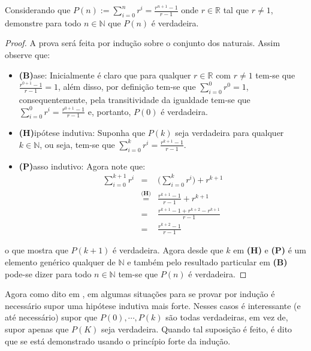 \begin{exemplo}\label{exe:InducaoFraca4}
	Considerando que $\displaystyle P(n) := \sum_{i = 0}^{n} r^i = \frac{r^{n+1} - 1}{r - 1}$ onde $r \in \mathbb{R}$ tal que $r \neq 1$, demonstre para todo $n \in \mathbb{N}$ que $P(n)$ é verdadeira.
	
	\begin{proof}
		A prova será feita por indução sobre o conjunto dos naturais. Assim observe que:
		\begin{itemize}
			\item[ ] \textbf{(B)}ase: Inicialmente é claro que para qualquer $r \in \mathbb{R}$ com $r \neq 1$ tem-se que $\frac{r^{0+1} - 1}{r - 1} = 1$, além disso, por definição tem-se que $\displaystyle \sum_{i=0}^{0} r^0 = 1$, consequentemente, pela transitividade da igualdade tem-se que  $\displaystyle\sum_{i = 0}^{0} r^i =\frac{r^{0+1} - 1}{r - 1} $ e, portanto, $P(0)$ é verdadeira.
			\item[ ] \textbf{(H)}ipótese indutiva: Suponha que $P(k)$ seja verdadeira para qualquer $k \in \mathbb{N}$, ou seja, tem-se que $\displaystyle\sum_{i = 0}^{k} r^i = \frac{r^{k+1} - 1}{r - 1}$.
			\item[ ] \textbf{(P)}asso indutivo:  Agora note que:
			\begin{eqnarray*}
				\sum_{i = 0}^{k+1} r^i & = & \Big(\sum_{i = 0}^{k} r^i\Big) + r^{k+1}\\
				& \stackrel{\textbf{(H)}}{=} & \frac{r^{k+1} - 1}{r - 1} + r^{k+1}\\
				& = & \frac{r^{k+1}-1 + r^{k+2} - r^{k+ 1}}{r-1}\\
				& = & \frac{r^{k+2}-1}{r-1}
			\end{eqnarray*}
		\end{itemize}
		o que mostra que $P(k + 1)$ é verdadeira. Agora desde que $k$ em \textbf{(H)} e \textbf{(P)} é um elemento genérico qualquer de $\mathbb{N}$ e também pelo resultado particular em  \textbf{(B)} pode-se dizer para todo $n \in \mathbb{N}$ tem-se que $P(n)$ é verdadeira.
	\end{proof}
\end{exemplo}

Agora como dito em \cite{carmo2013}, em algumas situações para se provar por indução é necessário supor uma hipótese indutiva mais forte. Nesses casos é interessante (e até necessário) supor que $P(0), \cdots, P(k)$ são todas verdadeiras, em vez de, supor apenas que $P(K)$ seja verdadeira. Quando tal suposição é feito, é dito que se está demonstrado usando o princípio forte da indução.


